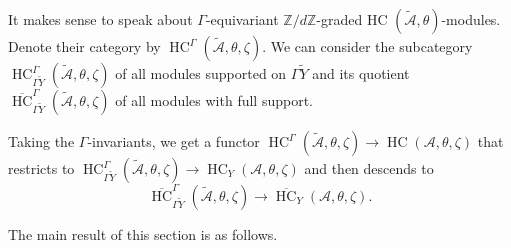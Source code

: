 \documentclass[12pt]{amsart}
\newcommand{\A}{\mathcal{A}}
\newcommand{\Z}{\mathbb{Z}}
\newcommand{\HC}{\operatorname{HC}}
\theoremstyle{definition}
\numberwithin{equation}{section}
\begin{document}
It makes sense to speak about $\Gamma$-equivariant $\Z/d\Z$-graded HC $(\tilde{\A},\theta)$-modules.
Denote their category by $\HC^\Gamma(\tilde{\A},\theta,\zeta)$. We can consider the subcategory
$\HC^\Gamma_{\Gamma\tilde{Y}}(\tilde{\A},\theta,\zeta)$ of all modules supported on $\Gamma\tilde{Y}$
and its quotient $\overline{\HC}^\Gamma_{\Gamma\tilde{Y}}(\tilde{\A},\theta,\zeta)$ of all modules with full support.

Taking the $\Gamma$-invariants, we get a functor $\HC^\Gamma(\tilde{\A},\theta,\zeta)\rightarrow
\HC(\A,\theta,\zeta)$ that restricts to $\HC^\Gamma_{\Gamma\tilde{Y}}(\tilde{\A},\theta,\zeta)\rightarrow
\HC_{Y}(\A,\theta,\zeta)$ and then descends to
\begin{equation}\label{eq:equiv_HC_invariants}
\overline{\HC}^\Gamma_{\Gamma\tilde{Y}}(\tilde{\A},\theta,\zeta)\rightarrow
\overline{\HC}_{Y}(\A,\theta,\zeta).
\end{equation}


The main result of this section is as follows.
\end{document}
